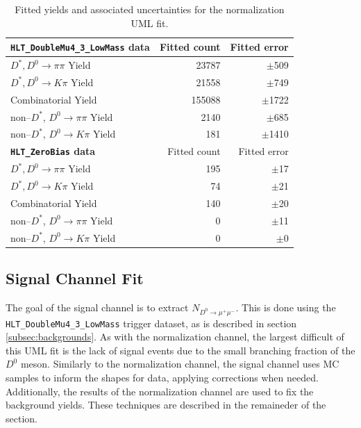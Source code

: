 \begin{table}[h!]
    \centering
    \begin{tabular}{@{}lrr@{}}
    \toprule
    \toprule
    \textbf{\texttt{HLT\_DoubleMu4\_3\_LowMass} data}& Fitted count & Fitted error  \\
    \midrule
    $D^*, D^0 \to \pi\pi$ Yield        & 23787 & $\pm$509 \\
    $D^*, D^0 \to K\pi$ Yield          & 21558  & $\pm$749 \\
    Combinatorial Yield               & 155088 & $\pm$1722 \\
    non--$D^*$, $D^0 \to \pi\pi$ Yield & 2140   & $\pm$685 \\
    non--$D^*$, $D^0 \to K\pi$ Yield   & 181     & $\pm$1410 \\
    \bottomrule
    \toprule
    \textbf{\texttt{HLT\_ZeroBias} data} & Fitted count & Fitted error \\
    \midrule
    $D^*, D^0 \to \pi\pi$ Yield        & 195 & $\pm$17 \\
    $D^*, D^0 \to K\pi$ Yield          & 74  & $\pm$21 \\
    Combinatorial Yield               & 140 & $\pm$20 \\
    non--$D^*$, $D^0 \to \pi\pi$ Yield & 0   & $\pm$11 \\
    non--$D^*$, $D^0 \to K\pi$ Yield   & 0     & $\pm$0 \\
    \bottomrule
    \bottomrule
    \end{tabular}
    \caption{Fitted yields and associated uncertainties for the normalization UML fit.}
    \label{tab:d0pipi_uml_fit_results}
    \end{table}

\subsection{Signal Channel Fit}

The goal of the signal channel is to extract $N_{D^0 \to \mu^+ \mu^-}$. This is done using the \texttt{HLT\_DoubleMu4\_3\_LowMass} trigger dataset, as is described in section \ref{subsec:backgrounds}. As with the normalization channel, the largest difficult of this UML fit is the lack of signal events due to the small branching fraction of the $D^0$ meson. Similarly to the normalization channel, the signal channel uses MC samples to inform the shapes for data, applying corrections when needed. Additionally, the results of the normalization channel are used to fix the background yields. These techniques are described in the remaineder of the section.

